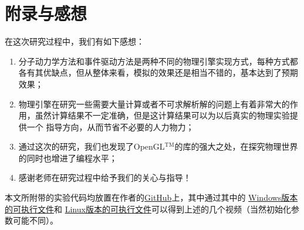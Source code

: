 ﻿\documentclass{article}
\begin{document}
	\section{附录与感想}
	\noindent 在这次研究过程中，我们有如下感想：
	\begin{enumerate}
		\item 分子动力学方法和事件驱动方法是两种不同的物理引擎实现方式，每种方式都各有其优缺点，但从整体来看，模拟的效果还是相当不错的，基本达到了预期效果；
		\item 物理引擎在研究一些需要大量计算或者不可求解析解的问题上有着非常大的作用，虽然计算结果不一定准确，但是这计算结果可以为以后真实的物理实验提供一个
		指导方向，从而节省不必要的人力物力；
		\item 通过这次的研究，我们也发现了OpenGL$^\text{TM}$的库的强大之处，在探究物理世界的同时也增进了编程水平；
		\item 感谢老师在研究过程中给予我们的关心与指导！
	\end{enumerate}
	本文所附带的实验代码均放置在作者的\href{https://github.com/PrayStarJirachi/OpenGL-Physical-Engine}{GitHub}上，其中通过其中的
	\href{https://github.com/PrayStarJirachi/OpenGL-Physical-Engine/tree/master/Execuable/Windows}{Windows版本的可执行文件}和
	\href{https://github.com/PrayStarJirachi/OpenGL-Physical-Engine/tree/master/Execuable/Linux}{Linux版本的可执行文件}可以得到上述的几个视频（当然初始化参数可能不同）。
	\newpage
	
	
\end{document}
